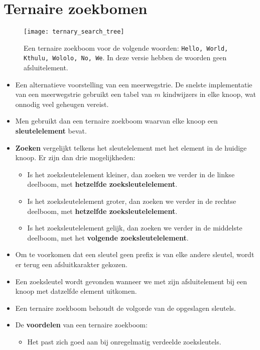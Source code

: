 \section{Ternaire zoekbomen}
\begin{figure}[ht]
    \centering
    \texttt{[image: ternary\_search\_tree]}
    \caption{Een ternaire zoekboom voor de volgende woorden: \texttt{Hello, World, Kthulu, Wololo, No, We}. In deze versie hebben de woorden geen afsluitelement.}
    \label{fig:ternary_search_tree}
\end{figure}
\begin{itemize}
    \item Een alternatieve voorstelling van een meerwegstrie.
    \alert De snelste implementatie van een meerwegstrie gebruikt een tabel van $m$ kindwijzers in elke knoop, wat onnodig veel geheugen vereist.
    \item Men gebruikt dan een ternaire zoekboom waarvan elke knoop een \textbf{sleutelelement} bevat.
    \item \textbf{Zoeken} vergelijkt telkens het sleutelelement met het element in de huidige knoop. Er zijn dan drie mogelijkheden:
    \begin{itemize}
        \item Is het zoeksleutelelement kleiner, dan zoeken we verder in de linkse deelboom, met \textbf{hetzelfde zoeksleutelelement}.
        \item Is het zoeksleutelelement groter, dan zoeken we verder in de rechtse deelboom, met \textbf{hetzelfde zoeksleutelelement}.
        \item Is het zoeksleutelelement gelijk, dan zoeken we verder in de middelste deelboom, met het \textbf{volgende zoeksleutelelement}.
    \end{itemize}
    \item Om te voorkomen dat een sleutel geen prefix is van elke andere sleutel, wordt er terug een afsluitkarakter gekozen.
    \item Een zoeksleutel wordt gevonden wanneer we met zijn afsluitelement bij een knoop met datzelfde element uitkomen.
    \item Een ternaire zoekboom behoudt de volgorde van de opgeslagen sleutels.
    \item De \textbf{voordelen} van een ternaire zoekboom:
    \begin{itemize}
        \item Het past zich goed aan bij onregelmatig verdeelde zoeksleutels.
        \begin{itemize}

\end{itemize}
\end{itemize}
\end{itemize}

